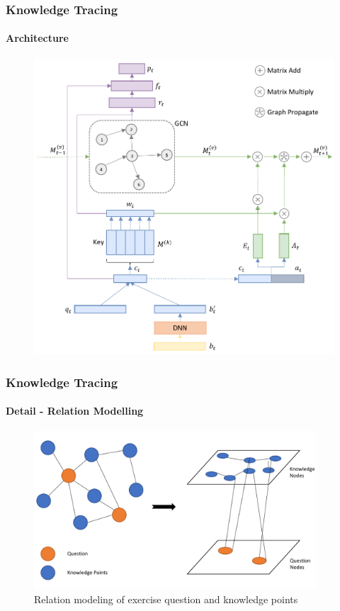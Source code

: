 \documentclass{beamer}
\begin{document}
\begin{frame}
  \frametitle{Knowledge Tracing}
  \framesubtitle{Architecture}
  \begin{figure}
    \centering
    \includegraphics[height=0.80\textheight]{figures/ch3-ov.pdf}
  \end{figure}
\end{frame}




\begin{frame}
  \frametitle{Knowledge Tracing}
  \framesubtitle{Detail - Relation Modelling}
  \begin{figure}
    \centering
    \includegraphics[width=0.94\textwidth]{figures/ch3-gat-kq.pdf}
    \caption{Relation modeling of exercise question and knowledge points}
  \end{figure}
\end{frame}
\end{document}
